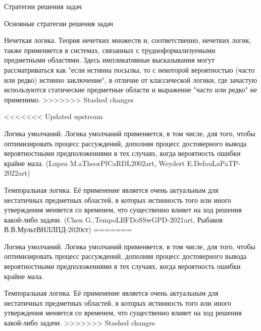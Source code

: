 \begin{frame}{Стратегии решения задач}
\begin{frame}{\large Основные стратегии решения задач}
\begin{textitemize}
\begin{frame}{}
\begin{textitemize}
        \item Нечеткая логика. Теория нечетких множеств и, соответственно, нечетких логик, также применяется в системах, связанных с трудноформализуемыми предметными областями. Здесь импликативные высказывания могут рассматриваться как "если истинна посылка, то с некоторой вероятностью (часто или редко) истинно заключение", в отличие от классической логики, где зачастую используются статические предметные области и выражение "часто или редко" не применимо. 
>>>>>>> Stashed changes
    \end{textitemize}
\end{frame}
\begin{frame}{}
    \begin{textitemize}
<<<<<<< Updated upstream
        \item Логика умолчаний. Логика умолчаний применяется, в том числе, для того, чтобы оптимизировать процесс рассуждений, дополняя процесс достоверного вывода вероятностными предположениями в тех случаях, когда вероятность ошибки крайне мала. (Lupea M.aTheorPfCaRDL2002art, Weydert E.DefauLaPaTP-2022art)
        \item Темпоральная логика. Её применение является очень актуальным для нестатичных предметных областей, в которых истинность того или иного утверждения меняется со временем, что существенно влияет на ход решения какой-либо задачи. (Chen G..TempoLIfFDoSSwGPD-2021art, Рыбаков В.В.МультВНЛЛПД-2020ст)        
=======
        \item Логика умолчаний. Логика умолчаний применяется, в том числе, для того, чтобы оптимизировать процесс рассуждений, дополняя процесс достоверного вывода вероятностными предположениями в тех случаях, когда вероятность ошибки крайне мала. 
        \item Темпоральная логика. Её применение является очень актуальным для нестатичных предметных областей, в которых истинность того или иного утверждения меняется со временем, что существенно влияет на ход решения какой-либо задачи.      
>>>>>>> Stashed changes
    \end{textitemize}  
\end{frame}



\end{textitemize}
\end{frame}
\end{frame}

